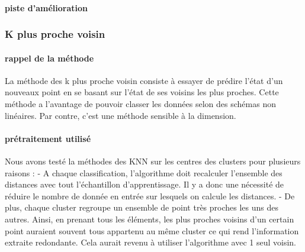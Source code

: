 \documentclass[a4paper,10pt]{report}
\begin{document}
\paragraph{piste d'amélioration}

\subsubsection{K plus proche voisin}
\paragraph{rappel de la méthode }
La méthode des k plus proche voisin consiste à essayer de prédire l’état d'un nouveaux point en se basant sur l'état de ses voisins les plus proches. Cette méthode a l'avantage de pouvoir classer les données selon des schémas non linéaires. Par contre, c'est une méthode sensible à la dimension. 
\paragraph{prétraitement utilisé}
Nous avons testé la méthodes des KNN sur les centres des clusters pour plusieurs raisons :
- A chaque classification, l'algorithme doit recalculer l'ensemble des distances avec tout l’échantillon d'apprentissage. Il y a donc une nécessité de réduire le nombre de donnée en entrée sur lesquels on calcule les distances.
- De plus, chaque cluster regroupe un ensemble de point très proches les uns des autres. Ainsi, en prenant tous les éléments, les plus proches voisins d'un certain point auraient souvent tous appartenu au même cluster ce qui rend l'information extraite redondante. Cela aurait revenu à utiliser l'algorithme avec 1 seul voisin. 
\end{document}
